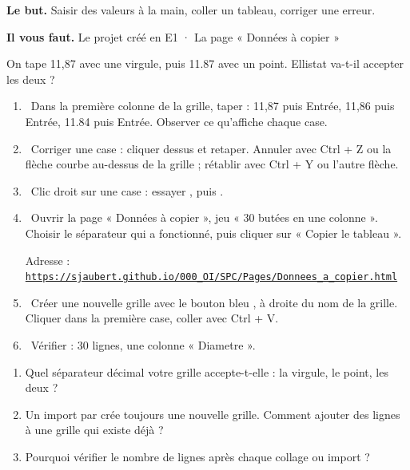 \documentclass[10pt,a4paper]{article}
\begin{document}
\thispagestyle{fancy}
\begin{tcolorbox}[boite]\textbf{Le but.} Saisir des valeurs à la main, coller un tableau, corriger une erreur.\par\textbf{Il vous faut.} Le projet créé en E1 · La page « Données à copier »\end{tcolorbox}
\begin{tcolorbox}[pred]On tape 11,87 avec une virgule, puis 11.87 avec un point. Ellistat va-t-il accepter les deux ?\reponse\end{tcolorbox}
\begin{enumerate}[label=\textcolor{cyan}{\textbf{\arabic*.}},leftmargin=15pt,itemsep=1.5pt]
\item \tagE\ Dans la première colonne de la grille, taper : 11,87 puis Entrée, 11,86 puis Entrée, 11.84 puis Entrée. Observer ce qu'affiche chaque case.
\item \tagE\ Corriger une case : cliquer dessus et retaper. Annuler avec Ctrl + Z ou la flèche courbe au-dessus de la grille ; rétablir avec Ctrl + Y ou l'autre flèche.
\item \tagE\ Clic droit sur une case : essayer , puis .
\item \tagW\ Ouvrir la page « Données à copier », jeu « 30 butées en une colonne ». Choisir le séparateur qui a fonctionné, puis cliquer sur « Copier le tableau ».\par Adresse : \href{https://sjaubert.github.io/000_OI/SPC/Pages/Donnees_a_copier.html}{\nolinkurl{https://sjaubert.github.io/000_OI/SPC/Pages/Donnees_a_copier.html}}
\item \tagE\ Créer une nouvelle grille avec le bouton bleu \menu{+}, à droite du nom de la grille. Cliquer dans la première case, coller avec Ctrl + V.
\item \tagE\ Vérifier : 30 lignes, une colonne « Diametre ».
\end{enumerate}
\begin{enumerate}[label=\textcolor{cyan}{\textbf{Q\arabic*.}},leftmargin=22pt]
\item Quel séparateur décimal votre grille accepte-t-elle : la virgule, le point, les deux ?\reponse[1]
\item Un import par  crée toujours une nouvelle grille. Comment ajouter des lignes à une grille qui existe déjà ?\reponse[1]
\item Pourquoi vérifier le nombre de lignes après chaque collage ou import ?\reponse[1]
\end{enumerate}
\end{document}
